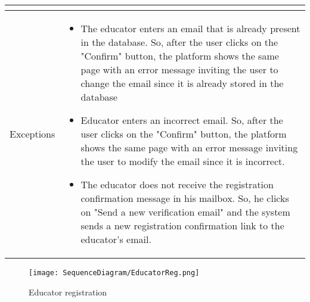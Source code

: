 \begin{longtable}{|c| p{10cm}|}
\begin{itemize}
\end{itemize}\\
\hline
Exceptions &
\begin{itemize}
\item The educator enters an email that is already present in the database. So, after the user clicks on the "Confirm" button, the platform shows the same page with an error message inviting the user to change the email since it is already stored in the database
\item Educator enters an incorrect email. So, after the user clicks on the "Confirm" button, the platform shows the same page with an error message inviting the user to modify the email since it is incorrect.
\item The educator does not receive the registration confirmation message in his mailbox. So, he clicks on "Send a new verification email" and the system sends a new registration confirmation link to the educator's email.
\end{itemize}\\
\hline
\end{longtable}

    \begin{figure}[H]
  \texttt{[image: SequenceDiagram/EducatorReg.png]} 
  \caption{Educator registration}
  \label{fig:immagine}
\end{figure}



